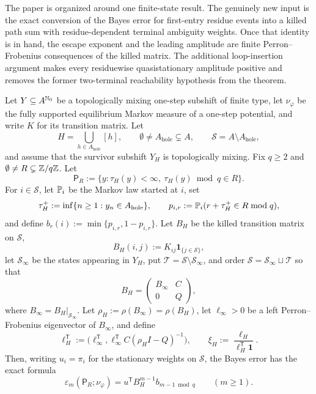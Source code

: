 The paper is organized around one finite-state result.  The genuinely
new input is the exact conversion of the Bayes error for first-entry
residue events into a killed path sum with residue-dependent terminal
ambiguity weights.  Once that identity is in hand, the escape exponent
and the leading amplitude are finite Perron--Frobenius consequences of
the killed matrix.  The additional loop-insertion argument makes every
residuewise quasistationary amplitude positive and removes the former
two-terminal reachability hypothesis from the theorem.

\begin{theorem}
\label{thm:main-amplitude}
Let \(Y\subseteq A^{\mathbb{N}_0}\) be a topologically mixing one-step
subshift of finite type, let \(\nu_\varphi\) be the fully supported
equilibrium Markov measure of a one-step potential, and write \(K\) for
its transition matrix.  Let
\[
  H=\bigcup_{h\in A_{\mathrm{hole}}}[h],
  \qquad
  \emptyset\neq A_{\mathrm{hole}}\subsetneq A,
  \qquad
  \mathcal S=A\setminus A_{\mathrm{hole}},
\]
and assume that the survivor subshift \(Y_H\) is topologically mixing.
Fix \(q\geq2\) and
\(\emptyset\neq R\subsetneq \mathbb{Z}/q\mathbb{Z}\).  Let
\[
  \mathsf P_R
  :=\{y:\tau_H(y)<\infty,\ \tau_H(y)\bmod q\in R\}.
\]
For \(i\in\mathcal S\), let \(\mathbb{P}_i\) be the Markov law started at \(i\),
set
\[
  \tau_H^+:=\inf\{n\geq1:y_n\in A_{\mathrm{hole}}\},
  \qquad
  p_{i,r}:=\mathbb{P}_i(r+\tau_H^+\in R\bmod q),
\]
and define \(b_r(i):=\min\{p_{i,r},1-p_{i,r}\}\).  Let \(B_H\) be the
killed transition matrix on \(\mathcal S\),
\[
  B_H(i,j):=K_{ij}\mathbf 1_{\{j\in\mathcal S\}},
\]
let \(\mathcal S_\infty\) be the states appearing in \(Y_H\), put
\(\mathcal T=\mathcal S\setminus\mathcal S_\infty\), and order
\(\mathcal S=\mathcal S_\infty\sqcup\mathcal T\) so that
\[
  B_H=
  \begin{pmatrix}
    B_\infty & C\\
    0 & Q
  \end{pmatrix},
\]
where \(B_\infty=B_H|_{\mathcal S_\infty}\).  Let
\(\rho_H:=\rho(B_\infty)=\rho(B_H)\), let \(\ell_\infty>0\) be a left
Perron--Frobenius eigenvector of \(B_\infty\), and define
\[
  \ell_H^{\mathsf T}
  :=
  \bigl(
    \ell_\infty^{\mathsf T},
    \ell_\infty^{\mathsf T}C(\rho_H I-Q)^{-1}
  \bigr),
  \qquad
  \xi_H:=\frac{\ell_H}{\ell_H^{\mathsf T}\mathbf 1}.
\]
Then, writing \(u_i=\pi_i\) for the stationary weights on
\(\mathcal S\), the Bayes error has the exact formula
\[
  \varepsilon_m(\mathsf P_R;\nu_\varphi)
  = u^{\mathsf T}B_H^{m-1}b_{m-1\bmod q}
  \qquad (m\geq1).
\]
\end{theorem}
